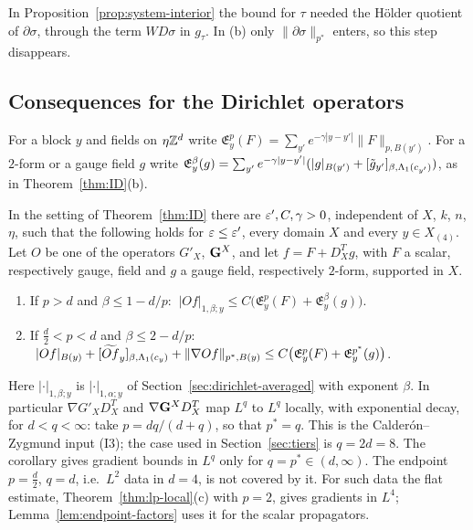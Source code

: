 In Proposition~\ref{prop:system-interior} the bound for $\tau$ needed the H\"older quotient of $\partial\sigma$, through the term $W D\sigma$ in $g_\tau$. In (b) only $\|\partial\sigma\|_{p^*}$ enters, so this step disappears.

\subsection{Consequences for the Dirichlet operators}\label{ss:43.5}

For a block $y$ and fields on $\eta\mathbb Z^d$ write $\mathfrak E^p_y(F)=\sum_{y'}e^{-\gamma|y-y'|}\|F\|_{p,B(y')}$. For a $2$-form or a gauge field $g$ write $\mathfrak E^{\beta}_y(g)=\sum_{y'}e^{-\gamma|y-y'|}(|g|_{B(y')}+[\tilde g_{y'}]_{\beta,\Lambda_1(c_{y'})})$, as in Theorem~\ref{thm:ID}(b).

\begin{corollary}\label{cor:lp-dirichlet}
In the setting of Theorem~\ref{thm:ID} there are $\varepsilon',C,\gamma>0$, independent of $X$, $k$, $n$, $\eta$, such that the following holds for $\varepsilon\le\varepsilon'$, every domain $X$ and every $y\in X_{(4)}$. Let $O$ be one of the operators $G'_X$, $\mathbf G^X$, and let $f=F+D^T_Xg$, with $F$ a scalar, respectively gauge, field and $g$ a gauge field, respectively $2$-form, supported in $X$.
\begin{enumerate}[label=(\alph*)]
\item If $p>d$ and $\beta\le1-d/p$: $\ |Of|_{1,\beta;y}\le C\big(\mathfrak E^p_y(F)+\mathfrak E^\beta_y(g)\big)$.
\item If $\frac d2<p<d$ and $\beta\le2-d/p$: $\ |Of|_{B(y)}+[\widetilde{Of}_y]_{\beta,\Lam_1(c_y)}+\|\nabla Of\|_{p^*,B(y)}\le C\big(\mathfrak E^p_y(F)+\mathfrak E^{p^*}_y(g)\big)$.
\end{enumerate}
Here $|\cdot|_{1,\beta;y}$ is $|\cdot|_{1,\alpha;y}$ of Section~\ref{sec:dirichlet-averaged} with exponent $\beta$. In particular $\nabla G'_XD^T_X$ and $\nabla\mathbf G^XD^T_X$ map $L^q$ to $L^q$ locally, with exponential decay, for $d<q<\infty$: take $p=dq/(d+q)$, so that $p^*=q$. This is the Calder\'on--Zygmund input (I3); the case used in Section~\ref{sec:tiers} is $q=2d=8$. The corollary gives gradient bounds in $L^q$ only for $q=p^*\in(d,\infty)$. The endpoint $p=\frac d2$, $q=d$, i.e.\ $L^2$ data in $d=4$, is not covered by it. For such data the flat estimate, Theorem~\ref{thm:lp-local}(c) with $p=2$, gives gradients in $L^4$; Lemma~\ref{lem:endpoint-factors} uses it for the scalar propagators.
\end{corollary}


